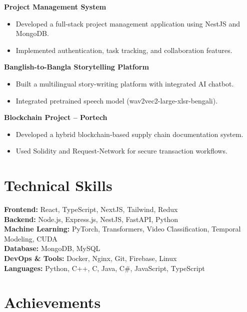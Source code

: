 \documentclass[11pt,a4paper]{article}
\begin{document}
\textbf{Project Management System}
\begin{itemize}
    \item Developed a full-stack project management application using NestJS and MongoDB.
    \item Implemented authentication, task tracking, and collaboration features.
\end{itemize}

\textbf{Banglish-to-Bangla Storytelling Platform}
\begin{itemize}
    \item Built a multilingual story-writing platform with integrated AI chatbot.
    \item Integrated pretrained speech model (wav2vec2-large-xlsr-bengali).
\end{itemize}

\textbf{Blockchain Project – Portech}
\begin{itemize}
    \item Developed a hybrid blockchain-based supply chain documentation system.
    \item Used Solidity and Request-Network for secure transaction workflows.
\end{itemize}


\section*{Technical Skills}

\textbf{Frontend:} React, TypeScript, NextJS, Tailwind, Redux \\
\textbf{Backend:} Node.js, Express.js, NestJS, FastAPI, Python \\
\textbf{Machine Learning:} PyTorch, Transformers, Video Classification, Temporal Modeling, CUDA \\
\textbf{Database:} MongoDB, MySQL \\
\textbf{DevOps \& Tools:} Docker, Nginx, Git, Firebase, Linux \\
\textbf{Languages:} Python, C++, C, Java, C\#, JavaScript, TypeScript


\section*{Achievements}
\end{document}
